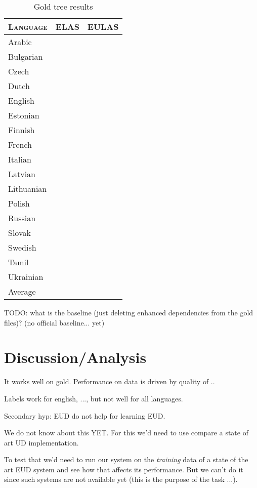 \documentclass[11pt,a4paper]{article}
\begin{document}
    
\begin{table}[h]
	\centering
	\begin{tabular}{l|rr}
		\textsc{Language} & \textsc{ELAS} & \textsc{EULAS} \\
		\hline 
		Arabic &  & \\
		Bulgarian &  & \\
		Czech &  & \\
		Dutch &  & \\
		English &  & \\
		Estonian &  & \\
		Finnish &  & \\
		French &  & \\
		Italian &  & \\
		Latvian &  & \\
		Lithuanian &  & \\
		Polish &  & \\
		Russian &  & \\
		Slovak &  & \\
		Swedish &  & \\
		Tamil &  & \\
		Ukrainian &  & \\
		Average &  & \\ 
	\end{tabular}
	\caption{Gold tree results}
\end{table} 

TODO: what is the baseline (just deleting enhanced dependencies from the gold files)? (no official baseline... yet)

\section{Discussion/Analysis}


It works well on gold.
Performance on data is driven by quality of ..

Labels work for english, ...,  but not well for all languages.

Secondary hyp: EUD do not help for learning EUD.

We do not know about this YET. For this we'd need to use compare a
state of art UD implementation.


To test that we'd need to run our system on the \emph{training} data
of a state of the art EUD system and see how that affects its
performance. But we can't do it since such systems are not available
yet (this is the purpose of the task ...).
\end{document}
